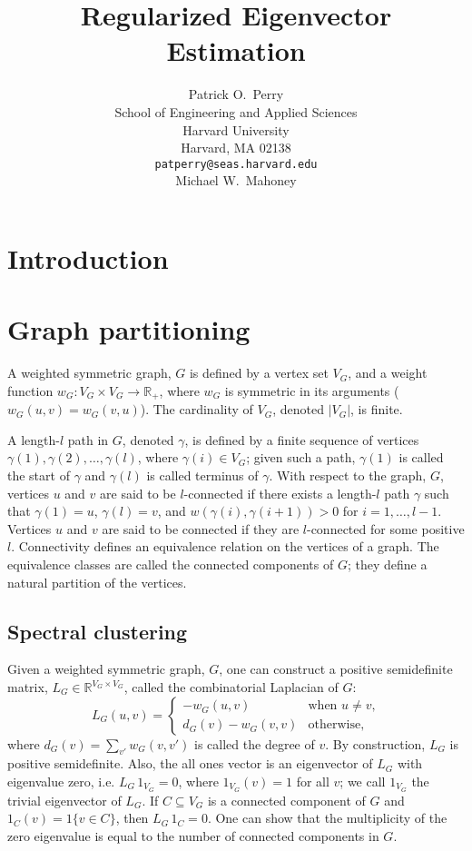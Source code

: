 \documentclass[12pt]{article}
\title{
  Regularized Eigenvector Estimation
}
\author{
  Patrick O.~Perry \\
  School of Engineering and Applied Sciences \\
  Harvard University \\
  Harvard, MA 02138 \\
  \texttt{patperry@seas.harvard.edu} \\
  \And
  Michael W.\ Mahoney
}
\newcommand{\reals}{\mathbb{R}}
\theoremstyle{plain}
\begin{document}
\maketitle

\begin{abstract}
\end{abstract}

\section{Introduction}

\section{Graph partitioning}
\label{S:introduction}

A weighted symmetric graph, $G$ is defined by a vertex set $V_G$, and a
weight function $w_G : V_G \times V_G \to \reals_+$, where $w_G$ is symmetric
in its arguments ($w_G(u,v) = w_G(v,u)$).  The cardinality of $V_G$,
denoted $|V_G|$, is finite.

A length-$l$ path in $G$, denoted $\gamma$, is defined by a finite sequence of
vertices $\gamma(1), \gamma(2), \ldots, \gamma(l)$, where $\gamma(i) \in V_G$; given
such a path, $\gamma(1)$ is called the start of $\gamma$ and 
$\gamma(l)$ is called terminus of $\gamma$.  With respect to
the graph, $G$, vertices $u$ and $v$ are said to be $l$-connected if there
exists a length-$l$ path $\gamma$ such that $\gamma(1) = u$,
$\gamma(l) = v$, and $w(\gamma(i), \gamma(i+1)) > 0$ for $i = 1,
\ldots, l-1$.  Vertices $u$ and $v$ are said to be connected if they
are $l$-connected for some positive $l$.  Connectivity defines an
equivalence relation on the vertices of a graph.  The equivalence
classes are called the connected components of $G$; they define a
natural partition of the vertices.

\subsection{Spectral clustering}

Given a weighted symmetric graph, $G$, one can construct a positive
semidefinite matrix, $L_G \in \reals^{V_G \times V_G}$, called the combinatorial Laplacian of $G$:
\[
  L_G(u,v)
  =
  \begin{cases}
    - w_G(u,v) & \text{when $u \neq v$,} \\
    d_G(v) - w_G(v,v) & \text{otherwise,}
  \end{cases}
\]
where $d_G(v) = \sum_{v'} w_G(v,v')$ is called the degree of $v$.
By construction, $L_G$ is positive semidefinite.  Also, the all ones
vector is an eigenvector of $L_G$ with eigenvalue zero, i.e. $L_G \, 1_{V_G}
= 0$, where $1_{V_G}(v) = 1$ for all $v$; we call $1_{V_G}$ the
trivial eigenvector of $L_G$.  If $C \subseteq V_G$ is a connected component of
$G$ and $1_C(v) = 1\{ v \in C \}$, then $L_G \, 1_C = 0$.  One can
show that the multiplicity of the zero eigenvalue is equal to the
number of connected components in $G$.
\end{document}

